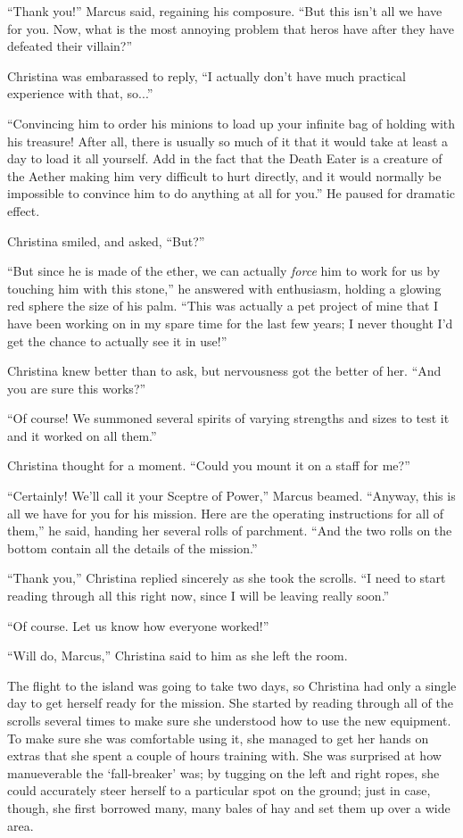 \documentclass[showtrims,b6paper,draft,10pt]{memoir}
\begin{document}
``Thank you!'' Marcus said, regaining his composure.  ``But this isn't all we have for you.  Now, what is the most annoying problem that heros have after they have defeated their villain?''

Christina was embarassed to reply, ``I actually don't have much practical experience with that, so...''

``Convincing him to order his minions to load up your infinite bag of holding with his treasure!  After all, there is usually so much of it that it would take at least a day to load it all yourself.  Add in the fact that the Death Eater is a creature of the Aether making him very difficult to hurt directly, and it would normally be impossible to convince him to do anything at all for you.''  He paused for dramatic effect.

Christina smiled, and asked, ``But?''

``But since he is made of the ether, we can actually \emph{force} him to work for us by touching him with this stone,'' he answered with enthusiasm, holding a glowing red sphere the size of his palm.  ``This was actually a pet project of mine that I have been working on in my spare time for the last few years;  I never thought I'd get the chance to actually see it in use!''

Christina knew better than to ask, but nervousness got the better of her.  ``And you are sure this works?''

``Of course!  We summoned several spirits of varying strengths and sizes to test it and it worked on all them.''

Christina thought for a moment.  ``Could you mount it on a staff for me?''

``Certainly!  We'll call it your Sceptre of Power,''  Marcus beamed.  ``Anyway, this is all we have for you for his mission.  Here are the operating instructions for all of them,'' he said, handing her several rolls of parchment.  ``And the two rolls on the bottom contain all the details of the mission.''

``Thank you,'' Christina replied sincerely as she took the scrolls.  ``I need to start reading through all this right now, since I will be leaving really soon.''

``Of course.  Let us know how everyone worked!''

``Will do, Marcus,''  Christina said to him as she left the room.

\timeskip


The flight to the island was going to take two days, so Christina had only a single day to get herself ready for the mission.  She started by reading through all of the scrolls several times to make sure she understood how to use the new equipment.  To make sure she was comfortable using it, she managed to get her hands on extras that she spent a couple of hours training with.  She was surprised at how manueverable the `fall-breaker' was;  by tugging on the left and right ropes, she could accurately steer herself to a particular spot on the ground;  just in case, though, she first borrowed many, many bales of hay and set them up over a wide area.
\end{document}
